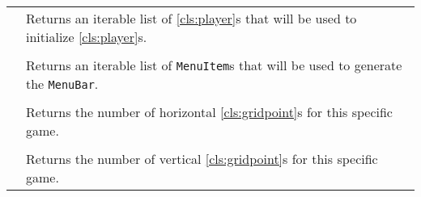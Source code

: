 \begin{longtable}{Lp{10cm}}
	& Returns an iterable list of \ref{cls:player}s that will be used to initialize \ref{cls:player}s. \\
	 \\
	& Returns an iterable list of \texttt{MenuItem}s that will be used to generate the \texttt{MenuBar}. \\
	 \\
	& Returns the number of horizontal \ref{cls:gridpoint}s for this specific game. \\
	 \\
	& Returns the number of vertical \ref{cls:gridpoint}s for this specific game. \\
	\hline
\end{longtable}